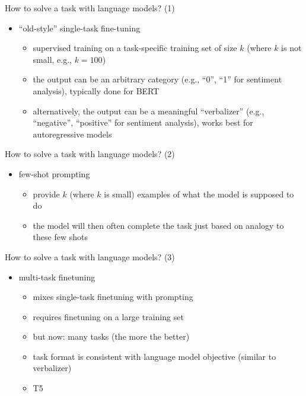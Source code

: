 \begin{frame}{How to solve a task with language models? (1)}

\vfill

\begin{itemize}
    \item ``old-style'' single-task fine-tuning 
        \begin{itemize}
            \item supervised training on a task-specific
        training set of size $k$ (where $k$ is not small,
        e.g., $k=100$)
        \item the output can be an arbitrary category (e.g.,
        ``0'', ``1'' for sentiment analysis), typically done
        for BERT
            \item alternatively, the output can be a
        meaningful ``verbalizer'' (e.g., ``negative'',
        ``positive'' for sentiment analysis), works best for
        autoregressive models
        \end{itemize}
\end{itemize}

\vfill

\end{frame}
\begin{frame}{How to solve a task with language models? (2)}

\vfill

\begin{itemize}
    \item few-shot prompting
        \begin{itemize}
            \item provide $k$ (where $k$ is small) examples of what the model is
supposed to do
        \item the model will then often complete the task
        just based on analogy to these few shots
        \end{itemize}
\end{itemize}

\vfill

\end{frame}
\begin{frame}{How to solve a task with language models? (3)}

\vfill

\begin{itemize}
\item multi-task finetuning
        \begin{itemize}
            \item mixes single-task finetuning with prompting
        \item requires finetuning on a large training set
        \item but now: many tasks (the more the better)
        \item task format is consistent with language model
            objective (similar to verbalizer)
            \item T5
        \end{itemize}
\end{itemize}

\vfill

\end{frame}

